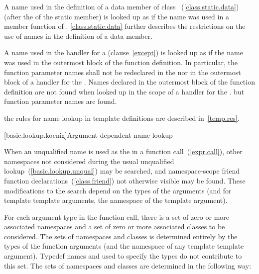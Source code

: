 \pnum
A name used in the definition of a  data member of class
~(\ref{class.static.data}) (after the 
of the static member) is looked up as if the name was used in a member
function of . \enternote \ref{class.static.data} further
describes the restrictions on the use of names in the definition of a
 data member. \exitnote

\pnum
A name used in the handler for a 
(clause~\ref{except}) is looked up as if the name was used in the
outermost block of the function definition. In particular, the function
parameter names shall not be redeclared in the
 nor in the outermost block of a handler
for the . Names declared in the outermost
block of the function definition are not found when looked up in the
scope of a handler for the . \enternote but
function parameter names are found. \exitnote

\pnum
\enternote the rules for name lookup in template definitions are
described in~\ref{temp.res}. \exitnote

[basic.lookup.koenig]{Argument-dependent name lookup}%

\pnum
When an unqualified name is used as the  in
a function call~(\ref{expr.call}), other namespaces not considered
during the usual unqualified lookup~(\ref{basic.lookup.unqual}) may be
searched, and namespace-scope friend function
declarations~(\ref{class.friend}) not otherwise visible may be found.
These modifications to the search depend on the types of the arguments
(and for template template arguments, the namespace of the template
argument).

\pnum
For each argument type  in the function call, there is a set of
zero or more associated namespaces and a set of zero or more associated
classes to be considered. The sets of namespaces and classes is
determined entirely by the types of the function arguments (and the
namespace of any template template argument). Typedef names and
 used to specify the types do not
contribute to this set. The sets of namespaces and classes are
determined in the following way:

